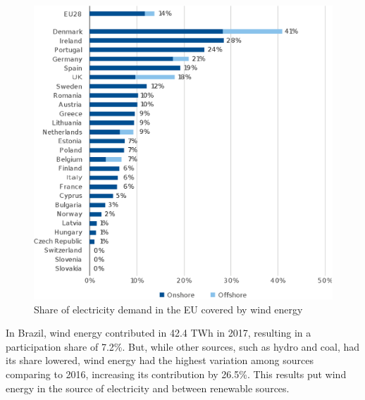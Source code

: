 \begin{figure}[htb]
	\caption{Share of electricity demand in the EU covered by wind energy}
	\begin{center}
		\includegraphics[scale=0.5]{Images/EUrank.eps}
	\end{center}
	\label{fig: EUrank}
\end{figure}

In Brazil, wind energy contributed in 42.4 TWh in 2017, resulting in a participation share of 7.2\%. But, while other sources, such as hydro and coal, had its share lowered, wind energy had the highest variation among sources comparing to 2016, increasing its contribution by 26.5\%. This results put wind energy in the  source of electricity and  between renewable sources.
